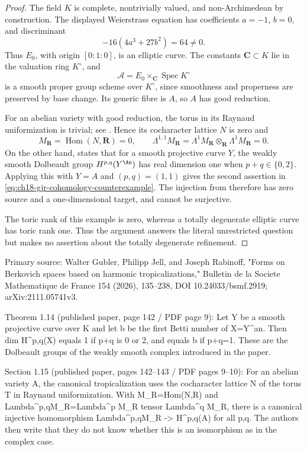 \begin{proof}
The field $K$ is complete, nontrivially valued, and non-Archimedean by
construction.  The displayed Weierstrass equation has coefficients
$a=-1$, $b=0$, and discriminant
\[
 -16(4a^3+27b^2)=64\ne0.
\]
Thus $E_0$, with origin $[0:1:0]$, is an elliptic curve.  The constants
$\mathbf C\subset K$ lie in the valuation ring $K^\circ$, and
\[
 \mathcal A=E_0\times_{\mathbf C}\operatorname{Spec}K^\circ
\]
is a smooth proper group scheme over $K^\circ$, since smoothness and
properness are preserved by base change.  Its generic fibre is $A$, so
$A$ has good reduction.

For an abelian variety with good reduction, the torus in its Raynaud
uniformization is trivial; see \cite[\S16]{GJR26}.  Hence its cocharacter
lattice $N$ is zero and
\[
 M_{\mathbf R}=\operatorname{Hom}(N,\mathbf R)=0,
 \qquad
 \Lambda^{1,1}M_{\mathbf R}
 =\Lambda^1M_{\mathbf R}\otimes_{\mathbf R}\Lambda^1M_{\mathbf R}=0.
\]
On the other hand, \cite[Theorem~1.14]{GJR26} states that for a smooth
projective curve $Y$, the weakly smooth Dolbeault group
$H^{p,q}(Y^{\An})$ has real dimension one when $p+q\in\{0,2\}$.
Applying this with $Y=A$ and $(p,q)=(1,1)$ gives the second assertion in
\eqref{eq:ch18-gjr-cohomology-counterexample}.  The injection from
\cite[\S1.15]{GJR26} therefore has zero source and a one-dimensional target,
and cannot be surjective.

The toric rank of this example is zero, whereas a totally degenerate elliptic
curve has toric rank one.  Thus the argument answers the literal unrestricted
question but makes no assertion about the totally degenerate refinement.
\end{proof}

Primary source: Walter Gubler, Philipp Jell, and Joseph Rabinoff,
"Forms on Berkovich spaces based on harmonic tropicalizations," Bulletin de
la Societe Mathematique de France 154 (2026), 135--238,
DOI 10.24033/bsmf.2919; arXiv:2111.05741v3.

Theorem 1.14 (published paper, page 142 / PDF page 9): Let Y be a smooth
projective curve over K and let b be the first Betti number of X=Y^an.  Then
dim H^{p,q}(X) equals 1 if p+q is 0 or 2, and equals b if p+q=1.  These are
the Dolbeault groups of the weakly smooth complex introduced in the paper.

Section 1.15 (published paper, pages 142--143 / PDF pages 9--10): For an
abelian variety A, the canonical tropicalization uses the cocharacter lattice
N of the torus T in Raynaud uniformization.  With M_R=Hom(N,R) and
Lambda^{p,q}M_R=Lambda^p M_R tensor Lambda^q M_R, there is a canonical
injective homomorphism Lambda^{p,q}M_R -> H^{p,q}(A) for all p,q.  The authors
then write that they do not know whether this is an isomorphism as in the
complex case.

